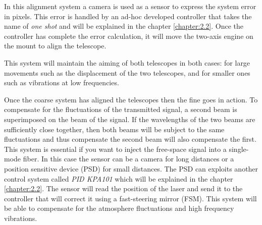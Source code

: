 In this alignment system a camera is used as a sensor to express the system error in pixels. This error is handled by an ad-hoc developed controller that takes the name of \textit{one shot} and will be explained in the chapter \ref{chapter:2.2}. Once the controller has complete the error calculation, it will move the two-axis engine on the mount to align the telescope.

This system will maintain the aiming of both telescopes in both cases: for large movements such as the displacement of the two telescopes, and for smaller ones such as vibrations at low frequencies.



Once the coarse system has aligned the telescopes then the fine goes in action. To compensate for the fluctuations of the transmitted signal, a second beam is superimposed on the beam of the signal. If the wavelengths of the two beams are sufficiently close together, then both beams will be subject to the same fluctuations and thus compensate the second beam will also compensate the first.
This system is essential if you want to inject the free-space signal into a single-mode fiber. In this case the sensor can be a camera for long distances or a position sensitive device (PSD) for small distances.
The PSD can exploits another control system called \textit{PID KPA101} which will be explained in the chapter \ref{chapter:2.2}. The sensor will read the position of the laser and send it to the controller that will correct it using a fast-steering mirror (FSM). This system will be able to compensate for the atmosphere fluctuations and high frequency vibrations.

